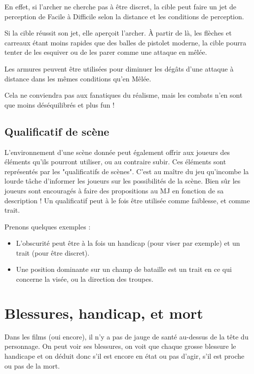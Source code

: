 En effet, si l'archer ne cherche pas à être discret, la cible peut faire un jet de perception de Facile à Difficile selon la distance et les conditions de perception.

Si la cible réussit son jet, elle aperçoit l'archer. À partir de là, les flèches et carreaux étant moins rapides que des balles de pistolet moderne, la cible pourra tenter de les esquiver ou de les parer comme une attaque en mêlée.

Les armures peuvent être utilisées pour diminuer les dégâts d'une attaque à distance dans les mêmes conditions qu'en Mêlée.

Cela ne conviendra pas aux fanatiques du réalisme, mais les combats n'en sont que moins déséquilibrés et plus fun !

\subsection{Qualificatif de scène}

L'environnement d'une scène donnée peut également offrir aux joueurs des éléments qu'ils pourront utiliser, ou au contraire subir. Ces éléments sont représentés par les "qualificatifs de scènes". C'est au maître du jeu qu'incombe la lourde tâche d'informer les joueurs sur les possibilités de la scène. Bien sûr les joueurs sont encouragés à faire des propositions au MJ en fonction de sa description ! Un qualificatif peut à le fois être utilisée comme faiblesse, et comme trait.

Prenons quelques exemples :

\begin{itemize}
    \item L’obscurité peut être à la fois un handicap (pour viser par exemple) et un trait (pour être discret). 
    \item Une position dominante sur un champ de bataille est un trait en ce qui concerne la visée, ou la direction des troupes.
\end{itemize} \smallskip

\section{Blessures, handicap, et mort}

Dans les films (oui encore), il n'y a pas de jauge de santé au-dessus de la tête du personnage. On peut voir ses blessures, on voit que chaque grosse blessure le handicape et on déduit donc s'il est encore en état ou pas d'agir, s'il est proche ou pas de la mort.

